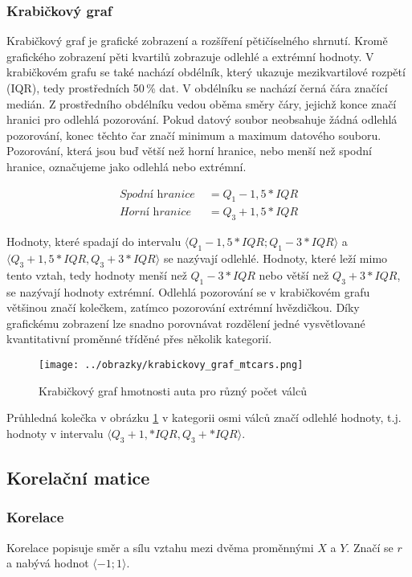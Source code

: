 \subsubsection{Krabičkový graf}
Krabičkový graf je grafické zobrazení a rozšíření pětičíselného shrnutí. Kromě grafického zobrazení pěti kvartilů  zobrazuje odlehlé a extrémní hodnoty.
V krabičkovém grafu se také nachází obdélník, který ukazuje mezikvartilové rozpětí (IQR), tedy prostředních 50\,\% dat. V obdélníku se nachází černá čára značící medián.
Z prostředního obdélníku vedou oběma směry čáry, jejichž konce značí hranici pro odlehlá pozorování. Pokud datový soubor neobsahuje žádná odlehlá pozorování, konec těchto čar
značí minimum a maximum datového souboru.
Pozorování, která jsou buď větší než horní hranice, nebo menší než spodní hranice, označujeme jako odlehlá nebo extrémní. 

\begin{align*}
    \textit{Spodní hranice } &= Q_1 - 1,5 * \textit{IQR} \\
    \textit{Horní hranice } &= Q_3 + 1,5 * \textit{IQR}
\end{align*}

Hodnoty, které spadají do intervalu $\langle Q_1 - 1,5*\textit{IQR}; Q_1 - 3*\textit{IQR}\rangle$ a $\langle Q_3 + 1,5*\textit{IQR}, Q_3 + 3*\textit{IQR} \rangle$ se nazývají
odlehlé. Hodnoty, které leží mimo tento vztah, tedy hodnoty menší než $Q_1 - 3*\textit{IQR}$ nebo větší než $Q_3 + 3*\textit{IQR}$, se nazývají hodnoty extrémní. Odlehlá
pozorování se v krabičkovém grafu většinou značí kolečkem, zatímco pozorování extrémní hvězdičkou. Díky grafickému zobrazení lze snadno porovnávat rozdělení jedné
vysvětlované kvantitativní proměnné tříděné přes několik kategorií.

\begin{figure}[H]
    \centering
    \texttt{[image: ../obrazky/krabickovy\_graf\_mtcars.png]}
    \caption{Krabičkový graf hmotnosti auta pro různý počet válců} 
    \label{fig:krabickovy_graf_mtcars}
\end{figure}

Průhledná kolečka v obrázku \ref{fig:krabickovy_graf_mtcars} v kategorii osmi válců značí odlehlé hodnoty, t.j. hodnoty
v intervalu $\langle Q_3 + 1,*\textit{IQR}, Q_3 + *\textit{IQR} \rangle$.

\subsection{Korelační matice}
\subsubsection{Korelace}
Korelace popisuje směr a sílu vztahu mezi dvěma proměnnými $X$ a $Y$. Značí se $r$ a nabývá hodnot $\langle -1; 1 \rangle$.

